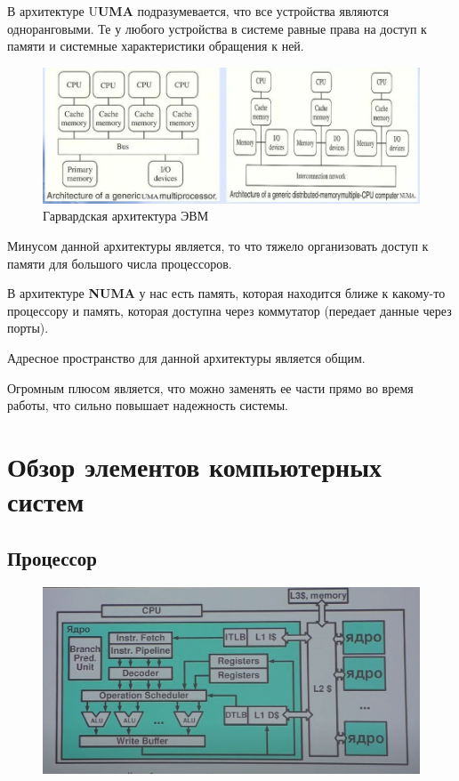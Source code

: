\documentclass[bachelor, och, pract]{SCWorks}
\theoremstyle{remark}
\begin{document}
    В архитектуре U\textbf{UMA} подразумевается, что все устройства являются одноранговыми. Те у любого устройства в системе равные права на доступ к памяти и системные характеристики обращения к ней. 

    \begin{figure}[H]
        \begin{center}
            \includegraphics[scale=0.5]{res/UMA-NUMA_architecture.png}
            \caption{Гарвардская архитектура ЭВМ}
        \end{center}
    \end{figure}

    Минусом данной архитектуры является, то что тяжело организовать доступ к памяти для большого числа процессоров.

    В архитектуре \textbf{NUMA} у нас есть память, которая находится ближе к какому-то процессору и память, которая доступна через коммутатор (передает данные через порты). 

    Адресное пространство для данной архитектуры является общим.

    Огромным плюсом является, что можно заменять ее части прямо во время работы, что сильно повышает надежность системы.

    \section{Обзор элементов компьютерных систем}
    
    \subsection{Процессор}
    \begin{figure}[H]
        \begin{center}
            \includegraphics[scale=0.5]{res/processor.png}
        \end{center}
    \end{figure}
\end{document}
